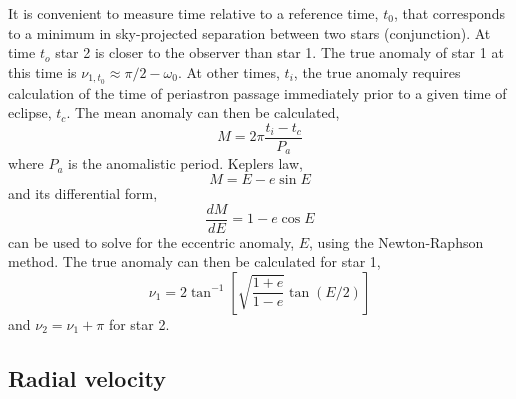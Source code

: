 It is convenient to measure time relative to a reference time, $t_0$, that corresponds to a minimum in sky-projected separation between two stars (conjunction).   At time $t_o$ star 2 is closer to the observer than star 1. The true anomaly of star 1 at this time is $\nu_{1, t_0} \approx \pi /2 - \omega_0$. At other times, $t_i$, the true anomaly requires calculation of the time of periastron passage immediately prior to a given time of eclipse, $t_c$. The mean anomaly can then be calculated,
\begin{equation}
M = 2 \pi \frac{t_i - t_c}{P_a}
\end{equation}
where $P_a$ is the anomalistic period. Keplers law,
\begin{equation}
M = E - e \sin E
\end{equation}
and its differential form,
\begin{equation}
\frac{dM}{dE} = 1 - e \cos E
\end{equation}
can be used to solve for the eccentric anomaly, $E$, using the Newton-Raphson method. The true anomaly can then be calculated for star 1,
\begin{equation}
\nu_1 = 2 \tan ^{-1} \left[   \sqrt{\frac{1 + e}{1 - e}}  \tan (E/2)     \right]
\end{equation}
and $\nu_2 = \nu_1 + \pi$ for star 2. 




\subsection{Radial velocity}

